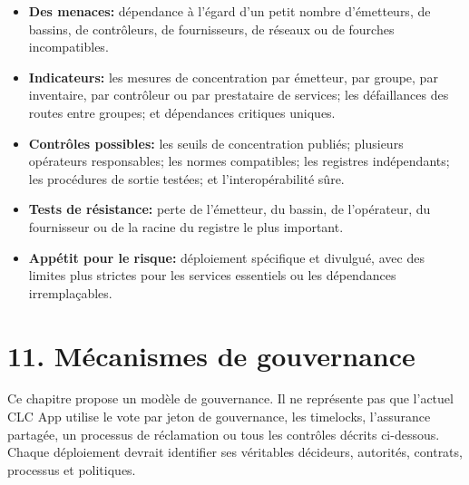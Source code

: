 \documentclass[11pt]{article}
\begin{document}
\begin{itemize}[leftmargin=*]
\item \textbf{Des menaces:} dépendance à l'égard d'un petit nombre d'émetteurs, de bassins, de contrôleurs, de fournisseurs, de réseaux ou de fourches incompatibles.
\item \textbf{Indicateurs:} les mesures de concentration par émetteur, par groupe, par inventaire, par contrôleur ou par prestataire de services; les défaillances des routes entre groupes; et dépendances critiques uniques.
\item \textbf{Contrôles possibles:} les seuils de concentration publiés; plusieurs opérateurs responsables; les normes compatibles; les registres indépendants; les procédures de sortie testées; et l'interopérabilité sûre.
\item \textbf{Tests de résistance:} perte de l'émetteur, du bassin, de l'opérateur, du fournisseur ou de la racine du registre le plus important.
\item \textbf{Appétit pour le risque:} déploiement spécifique et divulgué, avec des limites plus strictes pour les services essentiels ou les dépendances irremplaçables.
\end{itemize}

\section*{11. Mécanismes de gouvernance}

Ce chapitre propose un modèle de gouvernance. Il ne représente pas que l'actuel CLC App utilise le vote par jeton de gouvernance, les timelocks, l'assurance partagée, un processus de réclamation ou tous les contrôles décrits ci-dessous. Chaque déploiement devrait identifier ses véritables décideurs, autorités, contrats, processus et politiques.
\end{document}
